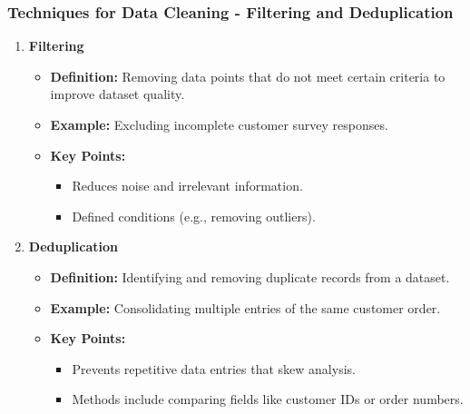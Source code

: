 \documentclass[aspectratio=169]{beamer}
\begin{document}
\begin{frame}[fragile]
    \frametitle{Techniques for Data Cleaning - Filtering and Deduplication}
    \begin{enumerate}
        \item \textbf{Filtering}
        \begin{itemize}
            \item \textbf{Definition:} Removing data points that do not meet certain criteria to improve dataset quality.
            \item \textbf{Example:} Excluding incomplete customer survey responses.
            \item \textbf{Key Points:}
            \begin{itemize}
                \item Reduces noise and irrelevant information.
                \item Defined conditions (e.g., removing outliers).
            \end{itemize}
        \end{itemize}
        
        \item \textbf{Deduplication}
        \begin{itemize}
            \item \textbf{Definition:} Identifying and removing duplicate records from a dataset.
            \item \textbf{Example:} Consolidating multiple entries of the same customer order.
            \item \textbf{Key Points:}
            \begin{itemize}
                \item Prevents repetitive data entries that skew analysis.
                \item Methods include comparing fields like customer IDs or order numbers.
            \end{itemize}
        \end{itemize}
    \end{enumerate}
\end{frame}
\end{document}
